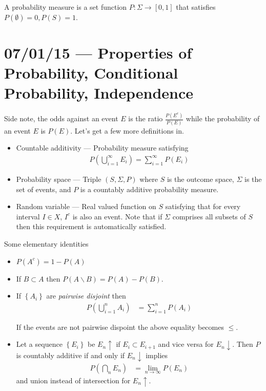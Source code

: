 \documentclass[10pt]{report}
\begin{document}
A probability measure is a set function $P: \Sigma \to [0,1]$ that satisfies $P(\emptyset) = 0, P(S) = 1$.

\chapter{07/01/15 --- Properties of Probability, Conditional Probability, Independence}

Side note, the odds against an event $E$ is the ratio $\frac{P(E^c)}{P(E)}$ while the probability of an event $E$ is $P(E)$. Let's get a few more definitions in. 

\begin{itemize}
    \item Countable additivity --- Probability measure satisfying 
        \begin{align}
            P\left( \bigcup_{i=1}^{\infty}E_i \right) = \sum\limits_{i=1}^{\infty}P(E_i)
        \end{align}
    \item Probability space --- Triple $(S,\Sigma,P)$ where $S$ is the outcome space, $\Sigma$ is the set of events, and $P$ is a countably additive probability measure.
    \item Random variable --- Real valued function on $S$ satisfying that for every interval $I \in X$, $I^c$ is also an event. Note that if $\Sigma$ comprises all subsets of $S$ then this requirement is automatically satisfied.
\end{itemize}

Some elementary identities
\begin{itemize}
    \item $P(A^c) = 1 - P(A)$
    \item If $B \subset A$ then $P(A \backslash B) = P(A) - P(B)$.
    \item If $\left\{ A_i \right\}$ are \emph{pairwise disjoint} then 
        \begin{align}
            P\left( \bigcup_{i=1}^n A_i \right) &= \sum\limits_{i=1}^{n}P(A_i)
        \end{align}

        If the events are not pairwise dispoint the above equality becomes $\leq$.
    \item Let a sequence $\left\{ E_i \right\}$ be $E_n\uparrow$ if $E_i \subset E_{i+1}$ and vice versa for $E_n\downarrow$. Then $P$ is countably additive if and only if $E_{n} \downarrow$ implies
        \begin{align}
            P\left( \bigcap_n E_n \right) &= \lim_{n \to \infty}P(E_n)
        \end{align}
        and union instead of intersection for $E_n\uparrow$.
\end{itemize}
\end{document}
